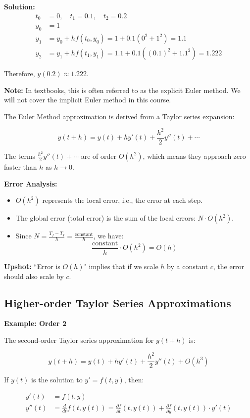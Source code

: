 \documentclass{article}
\begin{document}
\textbf{Solution:}
\begin{align*}
    t_0 &= 0, \quad t_1 = 0.1, \quad t_2 = 0.2 \\[6pt]
    y_0 &= 1 \\[6pt]
    y_1 &= y_0 + hf(t_0, y_0) = 1 + 0.1(0^2 + 1^2) = 1.1 \\[6pt]
    y_2 &= y_1 + hf(t_1, y_1) = 1.1 + 0.1((0.1)^2 + 1.1^2) = 1.222
\end{align*}

Therefore, $y(0.2) \approx 1.222$.


\textbf{Note:} In textbooks, this is often referred to as the explicit Euler method. We will not cover the implicit Euler method in this course.

The Euler Method approximation is derived from a Taylor series expansion:

\[
y(t+h) = y(t) + hy'(t) + \frac{h^2}{2}y''(t) + \cdots
\]

The terms $\frac{h^2}{2}y''(t) + \cdots$ are of order $O(h^2)$, which means they approach zero faster than $h$ as $h \to 0$.



\textbf{Error Analysis:}
\begin{itemize}
    \item $O(h^2)$ represents the local error, i.e., the error at each step.
    \item The global error (total error) is the sum of the local errors: $N \cdot O(h^2)$.
    \item Since $N = \frac{T_f - T_I}{h} = \frac{\text{constant}}{h}$, we have:
    \[
    \frac{\text{constant}}{h} \cdot O(h^2) = O(h)
    \]
\end{itemize}

\textbf{Upshot:} ``Error is $O(h)$" implies that if we scale $h$ by a constant $c$, the error should also scale by $c$.

\subsection*{Higher-order Taylor Series Approximations}

\textbf{Example: Order 2}

The second-order Taylor series approximation for $y(t+h)$ is:

\[
y(t+h) = y(t) + hy'(t) + \frac{h^2}{2} y''(t) + O(h^3)
\]

If $y(t)$ is the solution to $y' = f(t,y)$, then:

\begin{align*}
y'(t) &= f(t,y) \\
y''(t) &= \frac{d}{dt}f(t,y(t)) = \frac{\partial f}{\partial t}(t,y(t)) + \frac{\partial f}{\partial y}(t,y(t)) \cdot y'(t)
\end{align*}
\end{document}
